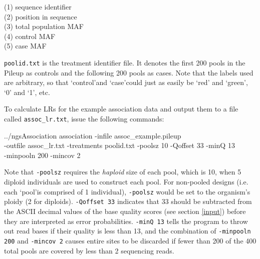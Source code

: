 \documentclass[12pt]{article}
\newenvironment{codeblock}{ \begin{framed}\ttfamily}{ \end{framed} }
\begin{document}
\vspace{5mm}

(1) sequence identifier\\
(2) position in sequence\\
(3) total population MAF\\
(4) control MAF\\
(5) case MAF

\vspace{5mm}

\texttt{poolid.txt} is the treatment identifier file. It denotes the first 200 pools in the Pileup as controls and the following 200 pools as cases. Note that the labels used are arbitrary, so that \lq control\rq\hspace{5pt}and \lq case\rq\hspace{5pt}could just as easily be \lq red\rq\hspace{1pt} and \lq green\rq, \lq 0\rq\hspace{1pt} and \lq 1\rq, etc. 

\vspace{5mm}

To calculate LRs for the example association data and output them to a file called \texttt{assoc\_lr.txt}, issue the following commands:

\begin{codeblock}
../ngsAssociation association -infile assoc\_example.pileup\\ -outfile assoc\_lr.txt -treatments poolid.txt -poolsz 10 -Qoffset 33 -minQ 13\\ -minpooln 200 -mincov 2
\end{codeblock}

Note that \texttt{-poolsz} requires the \emph{haploid} size of each pool, which is 10, when 5 diploid individuals are used to construct each pool. For non-pooled designs (i.e. each \lq pool\rq\hspace{5pt}is comprised of 1 individual), \texttt{-poolsz} would be set to the organism's ploidy (2 for diploids). \texttt{-Qoffset 33} indicates that 33 should be subtracted from the ASCII decimal values of the base quality scores (see section \ref{input}) before they are interpreted as error probabilities. \texttt{-minQ 13} tells the program to throw out read bases if their quality is less than 13, and the combination of \texttt{-minpooln 200} and \texttt{-mincov 2} causes entire sites to be discarded if fewer than 200 of the 400 total pools are covered by less than 2 sequencing reads.
\end{document}

